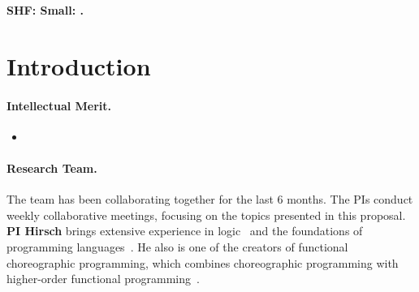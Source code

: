 \begin{center}
{\bf \Large SHF: Small: .}
\end{center}

\section{Introduction}
\label{sec:intro}


\paragraph{Intellectual Merit.} 

\smallskip 
\begin{itemize}[noitemsep,nolistsep]
\item 
\end{itemize}


\paragraph{Research Team.}   The team has been collaborating together for the last 6 months.  The PIs conduct weekly collaborative meetings, focusing on the topics presented in this proposal. 
{\bf PI Hirsch}  brings extensive experience in logic~\cite{HirschACAT20,HirschC13} and the foundations of programming languages~\cite{HirschC21,HirschT18}.
He also is one of the creators of functional choreographic programming, which combines choreographic programming with higher-order functional programming~\cite{HirschG22}.

